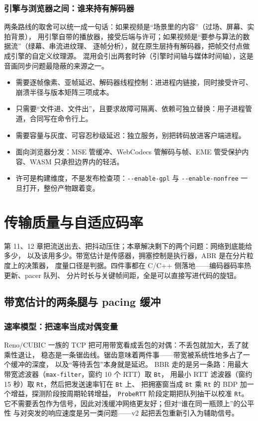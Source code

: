 \documentclass[12pt,a4paper,fontset=fandol]{ctexbook}
\newcommand{\Tp}[1]{\texttt{#1}}
\newcommand{\Opt}[1]{\texttt{-\/-#1}}
\newcommand{\Bk}{\discretionary{}{}{}}
\begin{document}
\subsection*{引擎与浏览器之间：谁来持有解码器}
两条路线的取舍可以统一成一句话：如果视频是``场景里的内容''（过场、屏幕、实拍背景），
用引擎自带的播放器，接受后端与许可；如果视频是``要参与算法的数据流''（绿幕、串流进纹理、
逐帧分析），就在原生层持有解码器，把帧交付点做成引擎的自定义纹理源。
混用会引出两套时钟（引擎时间轴与媒体时间轴），这是音画同步问题最隐蔽的来源之一。

\begin{guideline}[title={形态判据}]
\begin{itemize}
\item 需要逐帧像素、亚帧延迟、解码器线程控制：进进程内链接，同时接受许可、崩溃半径与版本矩阵三项成本。
\item 只需要``文件进、文件出''，且要求故障可隔离、依赖可独立替换：用子进程管道，合同写在命令行上。
\item 需要容量与灰度、可容忍秒级延迟：独立服务，别把转码放进客户端进程。
\item 面向浏览器分发：MSE 管缓冲、WebCodecs 管解码与帧、EME 管受保护内容、WASM 只承担边界内的轻活。
\item 许可是构建维度，不是发布检查项：\Opt{enable-{\Bk}gpl} 与 \Opt{enable-{\Bk}nonfree} 一旦打开，整份产物跟着变。
\end{itemize}
\end{guideline}

\chapter{传输质量与自适应码率}
\label{ch:ch14-congestion-abr}

第 11、12 章把流送出去、把抖动压住；本章解决剩下的两个问题：网络到底能给多少，
以及该用多少。带宽估计是传感器，拥塞控制是执行器，ABR 是在分片粒度上的决策器，
度量口径是判据。四件事都在 C/C++ 侧落地——编码器码率热更新、pacer 队列、
分片时长与关键帧间距，全是可以直接写进代码的旋钮。

\section{带宽估计的两条腿与 pacing 缓冲}

\subsection*{速率模型：把速率当成对偶变量}
Reno/CUBIC 一族的 TCP 把可用带宽看成丢包的对偶：不丢包就加大，丢了就乘性退让，
稳态是一条锯齿线。锯齿意味着两件事——带宽被系统性地多占了一个缓冲的深度，
以及``等待丢包''本身就是延迟。
BBR 走的是另一条路：用最大带宽滤波器（\Tp{max\Bk-{\Bk}filter}，窗约 10 个 RTT）取 \Tp{Bt}，
用最小 RTT 滤波器（窗约 15 秒）取 \Tp{Rt}，然后把发送速率钉在 \Tp{Bt} 上、
把拥塞窗当成 \Tp{Bt} 乘 \Tp{Rt} 的 BDP 加一个增益，探测阶段按周期轮转增益，
\Tp{ProbeRTT} 阶段定期把队列抽干以校准 \Tp{Rt}。
它不需要丢包作为信号，因此对浅缓冲网络更友好；但对``谁在同一瓶颈上''的公平性
与对突发的响应速度是另一类问题——v2 起把丢包重新引入为辅助信号。
\end{document}
